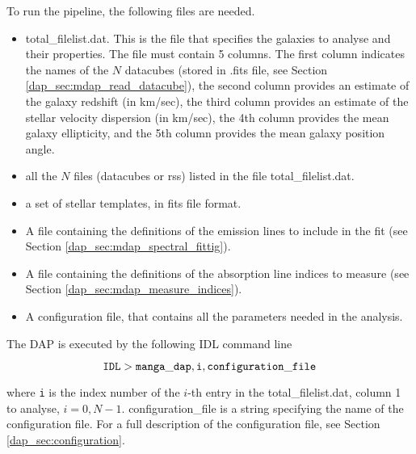 To run the pipeline, the following files are needed.
\begin{itemize}

\item total\_filelist.dat. This is the file that specifies the
  galaxies to analyse and their properties. The file must contain 5
  columns. The first column indicates the names of the $N$ datacubes
  (stored in .fits file, see Section
  \ref{dap_sec:mdap_read_datacube}), the second column provides an
  estimate of the galaxy redshift (in km/sec), the third column
  provides an estimate of the stellar velocity dispersion (in km/sec),
  the 4th column provides the mean galaxy ellipticity, and the 5th
  column provides the mean galaxy position angle.

\item all the $N$ files (datacubes or rss) listed in the file total\_filelist.dat.

\item a set of stellar templates, in fits file format.


\item A file containing the definitions of the emission lines to include in the fit (see Section \ref{dap_sec:mdap_spectral_fittig}).

\item A file containing the definitions of the absorption line indices to measure (see Section \ref{dap_sec:mdap_measure_indices}). 

\item A configuration file, that contains all the parameters needed in the analysis.
\end{itemize}

The DAP is executed by the following IDL command line 

\[
{\tt IDL> manga\_dap,i,configuration\_file}
\]

where {\tt i} is the index number of the $i$-th entry in the
total\_filelist.dat, column 1 to analyse, $i=0,
N-1$. configuration\_file is a string specifying the name of the
configuration file. For a full description of the configuration file,
see Section \ref{dap_sec:configuration}.


